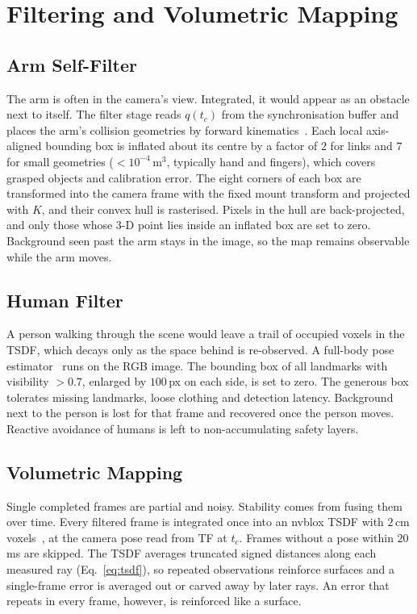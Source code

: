 \documentclass[conference]{IEEEtran}
\begin{document}
\section{Filtering and Volumetric Mapping}
\label{sec:filtermap}

\subsection{Arm Self-Filter}
\label{sec:selffilter}
The arm is often in the camera's view. Integrated, it would appear as an
obstacle next to itself. The filter stage reads \(q(t_c)\) from the
synchronisation buffer and places the arm's collision geometries by forward
kinematics~\cite{carpentier2019pinocchio}. Each local axis-aligned bounding
box is inflated about its centre by a factor of \(2\) for links and \(7\) for
small geometries (\(<10^{-4}\,\)m\(^3\), typically hand and fingers), which
covers grasped objects and calibration error. The eight corners of each box
are transformed into the camera frame with the fixed mount transform and
projected with \(K\), and their convex hull is rasterised. Pixels in the hull
are back-projected, and only those whose 3-D point lies inside an inflated box
are set to zero. Background seen past the arm stays in the image, so the map
remains observable while the arm moves.

\subsection{Human Filter}
\label{sec:humanfilter}
A person walking through the scene would leave a trail of occupied voxels in
the TSDF, which decays only as the space behind is re-observed. A full-body
pose estimator~\cite{lugaresi2019mediapipe,bazarevsky2020blazepose} runs on the
RGB image. The bounding box of all landmarks with visibility \(>0.7\),
enlarged by \(100\,\)px on each side, is set to zero. The generous box
tolerates missing landmarks, loose clothing and detection latency. Background
next to the person is lost for that frame and recovered once the person moves.
Reactive avoidance of humans is left to non-accumulating safety layers.

\subsection{Volumetric Mapping}
\label{sec:nvblox}
Single completed frames are partial and noisy. Stability comes from fusing
them over time. Every filtered frame is integrated once into an nvblox TSDF
with \(2\,\)cm voxels~\cite{millane2024nvblox}, at the camera pose read from TF
at \(t_c\). Frames without a pose within \(20\,\)ms are skipped. The TSDF
averages truncated signed distances along each measured ray
(Eq.~\eqref{eq:tsdf}), so repeated observations reinforce surfaces
and a single-frame error is averaged out or carved away by later rays. An
error that repeats in every frame, however, is reinforced like a surface.
\end{document}

